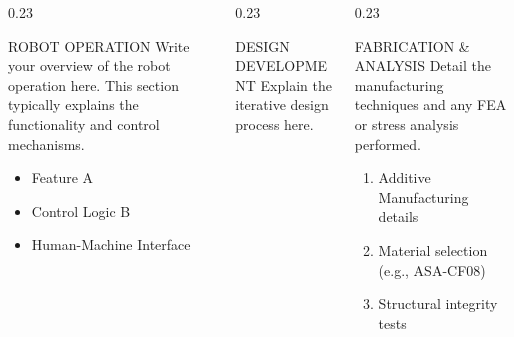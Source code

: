\documentclass[final]{beamer}
\begin{document}
\begin{frame}[t]
\begin{columns}[T]
    \begin{column}{0.23\paperwidth}
        \begin{goldbox}{ROBOT OPERATION}
            Write your overview of the robot operation here. This section typically explains the functionality and control mechanisms.
            \begin{itemize}
                \item Feature A
                \item Control Logic B
                \item Human-Machine Interface
            \end{itemize}
            \vspace{1cm} %
        \end{goldbox}
    \end{column}

    \begin{column}{0.23\paperwidth}
        \begin{goldbox}{DESIGN DEVELOPMENT}
            Explain the iterative design process here.
            \vspace{0.5cm}
            \begin{center}
            \end{center}
        \end{goldbox}
    \end{column}

    \begin{column}{0.23\paperwidth}
        \begin{goldbox}{FABRICATION \& ANALYSIS}
            Detail the manufacturing techniques and any FEA or stress analysis performed.
            \begin{enumerate}
                \item Additive Manufacturing details
                \item Material selection (e.g., ASA-CF08)
                \item Structural integrity tests
            \end{enumerate}
        \end{goldbox}
    \end{column}


\end{columns}
\end{frame}
\end{document}
